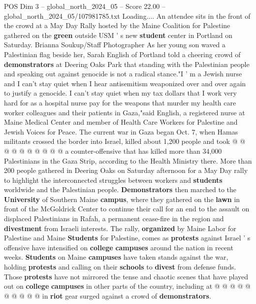 \begin{textsample}{POS Dim 3 – global\_north\_2024\_05 – Score 22.00 – global\_north\_2024\_05/107981785.txt}  \label{ex:f3_pos_016}
Loading....
An attendee sits in the front of the crowd at a May Day Rally hosted by the Maine Coalition for Palestine gathered on the \textbf{green} outside USM ' s new \textbf{student} center in Portland on Saturday.
Brianna Soukup/Staff Photographer As her young son waved a Palestinian flag beside her, Sarah English of Portland told a cheering crowd of \textbf{demonstrators} at Deering Oaks Park that standing with the Palestinian people and speaking out against genocide is not a radical stance."I ' m a Jewish nurse and I can't stay quiet when I hear antisemitism weaponized over and over again to justify a genocide.
I can't stay quiet when my tax dollars that I work very hard for as a hospital nurse pay for the weapons that murder my health care worker colleagues and their patients in Gaza,"said English, a registered nurse at Maine Medical Center and member of Health Care Workers for Palestine and Jewish Voices for Peace.
The current war in Gaza began Oct. 7, when Hamas militants crossed the border into Israel, killed about 1,200 people and took @ @ @ @ @ @ @ @ @ @ a counter-offensive that has killed more than 34,000 Palestinians in the Gaza Strip, according to the Health Ministry there.
More than 200 people gathered in Deering Oaks on Saturday afternoon for a May Day rally to highlight the interconnected struggles between workers and \textbf{students} worldwide and the Palestinian people. \textbf{Demonstrators} then marched to the \textbf{University} of Southern Maine \textbf{campus}, where they gathered on the \textbf{lawn} in front of the McGoldrick Center to continue their call for an end to the assault on displaced Palestinians in Rafah, a permanent cease-fire in the region and \textbf{divestment} from Israeli interests.
The rally, \textbf{organized} by Maine Labor for Palestine and Maine \textbf{Students} for Palestine, comes as \textbf{protests} against Israel ' s offensive have intensified on \textbf{college} \textbf{campuses} around the nation in recent weeks. \textbf{Students} on Maine \textbf{campuses} have taken stands against the war, holding \textbf{protests} and calling on their \textbf{schools} to \textbf{divest} from defense funds.
Those \textbf{protests} have not mirrored the tense and chaotic scenes that have played out on \textbf{college} \textbf{campuses} in other parts of the country, including at @ @ @ @ @ @ @ @ @ @ in \textbf{riot} gear surged against a crowd of \textbf{demonstrators}.

\end{textsample}
